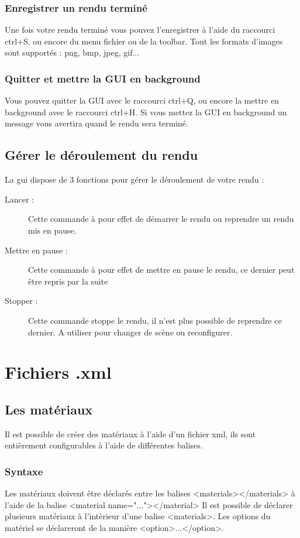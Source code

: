 \documentclass{report}
\begin{document}
\section{Enregistrer un rendu termin\'e}
Une fois votre rendu termin\'e vous pouvez l'enregistrer \`a l'aide du raccourci ctrl+S, ou encore du menu fichier ou de la toolbar.
Tout les formats d'images sont support\'es : png, bmp, jpeg, gif...
\section{Quitter et mettre la GUI en background}
Vous pouvez quitter la GUI avec le raccourci ctrl+Q, ou encore la mettre en background avec le raccourci ctrl+H.
Si vous mettez la GUI en background un message vous avertira quand le rendu sera termin\'e.
\chapter{G\'erer le d\'eroulement du rendu}
La gui dispose de 3 fonctions pour g\'erer le d\'eroulement de votre rendu :
\begin{description}
 \item [Lancer :] Cette commande \`a pour effet de d\'emarrer le rendu ou reprendre un rendu mis en pause.
 \item [Mettre en pause :] Cette commande \`a pour effet de mettre en pause le rendu, ce dernier peut \^etre repris par la suite
 \item [Stopper :] Cette commande stoppe le rendu, il n'est plus possible de reprendre ce dernier. A utiliser pour changer de sc\`ene ou reconfigurer.
\end{description}
\part{Fichiers .xml}
\chapter{Les mat\'eriaux}
Il est possible de cr\'eer des mat\'eriaux \`a l'aide d'un fichier xml, ils sont enti\`erement configurables \`a l'aide de diff\'erentes balises.
\section{Syntaxe}
Les mat\'eriaux doivent \^etre d\'eclar\'es entre les balises <materials></materials> \`a l'aide de la balise <material name="..."></material>
\newline Il est possible de d\'eclarer plusieurs mat\'eriaux \`a l'int\`erieur d'une balise <materials>.
\newline Les options du mat\'eriel se d\'eclareront de la mani\`ere <option>...</option>.
\end{document}
